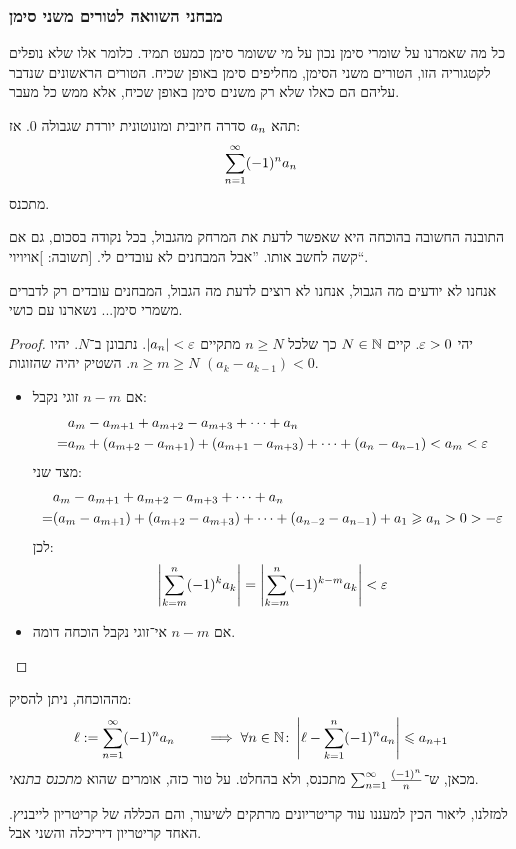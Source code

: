 \documentclass[name=רשימות חשבון דיפרנציאלי ואינטגרלי 1א]{../../../tex/classes/megasumPreamble}
\begin{document}
	\subsubsection{מבחני השוואה לטורים משני סימן}
	כל מה שאמרנו על שומרי סימן נכון על מי ששומר סימן כמעט תמיד. כלומר אלו שלא נופלים לקטגוריה הזו, הטורים משני הסימן, מחליפים סימן באופן שכיח. הטורים הראשונים שנדבר עליהם הם כאלו שלא רק משנים סימן באופן שכיח, אלא ממש כל מעבר.

	\begin{Theorem}
		תהא $a_n$ סדרה חיובית ומונוטונית יורדת שגבולה $0$. אז:
		\[ \sum_{n = 1}^{\infty} (-1)^{n}a_n \]
		מתכנס.
	\end{Theorem}
	התובנה החשובה בהוכחה היא שאפשר לדעת את המרחק מהגבול, בכל נקודה בסכום, גם אם קשה לחשב אותו. ''אבל המבחנים לא עובדים לי. [תשובה: ]אויויוי``.

	אנחנו לא יודעים מה הגבול, אנחנו לא רוצים לדעת מה הגבול, המבחנים עובדים רק לדברים משמרי סימן... נשארנו עם כושי.
	\begin{proof}
		יהי $\eg > 0$. קיים $N \in \mathbb{N}$ כך שלכל $n \ge N$ מתקיים $\sof{a_n} < \eg$. נתבונן ב־$N$. יהיו $n \ge m \ge N$. השטיק יהיה שהזוגות $(a_{k} - a_{k - 1}) < 0$.
		\begin{itemize}
			\item אם $n- m$ זוגי נקבל:
			\begin{align*}
				&a_m - a_{m + 1} + a_{m + 2} - a_{m + 3} + \cdots + a_n \\ = &a_m + (a_{m + 2} - a_{m + 1}) + (a_{m + 1} - a_{m + 3}) + \cdots + (a_n - a_{n - 1}) < a_m < \eg
			\end{align*}
			מצד שני:
			\begin{align*}
				&a_m - a_{m + 1} + a_{m + 2} - a_{m + 3} + \cdots + a_n \\
				= &(a_m - a_{m + 1}) + (a_{m + 2} - a_{m + 3}) + \cdots + (a_{n - 2} - a_{n - 1}) + a_1 \ge a_n > 0 > - \eg
			\end{align*}
			לכן:
			\[ \sof{\sum_{k = m}^{n}(-1)^{k}a_k} = \sof{\sum_{k = m}^{n}(-1)^{k - m}a_k} < \eg \]
			\item אם $n - m$ אי־זוגי נקבל הוכחה דומה.
		\end{itemize}
	\end{proof}
	מההוכחה, ניתן להסיק:
	\[ \ell := \sum_{n = 1}^{\infty} (-1)^{n}a_n \quad \quad \implies \forall n \in \mathbb{N} \colon \left \lvert \ell - \sum_{k = 1}^{n} (-1)^{n}a_n \right \rvert \leqslant a_{n + 1} \]
	מכאן, ש־$\sum_{n = 1}^{\infty} \frac{(-1)^{n}}{n}$ מתכנס, ולא בהחלט. על טור כזה, אומרים שהוא \textit{מתכנס בתנאי}.

	למזלנו, ליאור הכין למעננו עוד קריטריונים מרתקים לשיעור, והם הכללה של קריטריון לייבניץ. האחד קריטריון דיריכלה והשני אבל.
\end{document}
